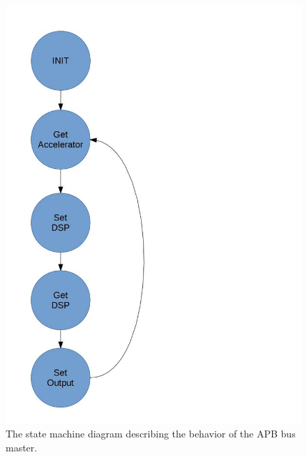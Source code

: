 \documentclass[%
	a4paper,
]
{article}
\begin{document}
\begin{figure}[h!]
 \includegraphics[width = \textwidth]{fig/MasterStatemachine.jpg}
 \caption{The state machine diagram describing the behavior of the APB bus master.}
 \label{fig:stateMachineMaster}
\end{figure}


%
%
\end{document}
